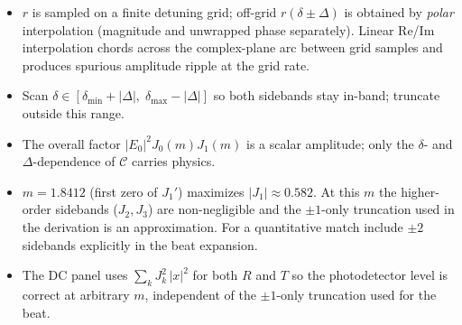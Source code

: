 \documentclass[aps,pra, onecolumn,superscriptaddress,nopacs,floatfix, showkeys, notitlepage]{revtex4-1}
\begin{document}
\begin{itemize}\setlength\itemsep{2pt}
  \item $r$ is sampled on a finite detuning grid; off-grid
        $r(\delta\pm\Delta)$ is obtained by \emph{polar} interpolation
        (magnitude and unwrapped phase separately). Linear Re/Im
        interpolation chords across the complex-plane arc between grid
        samples and produces spurious amplitude ripple at the grid rate.
  \item Scan $\delta \in [\delta_{\min} + |\Delta|,\; \delta_{\max} - |\Delta|]$
        so both sidebands stay in-band; truncate outside this range.
  \item The overall factor $|E_0|^2 J_0(m) J_1(m)$ is a scalar amplitude;
        only the $\delta$- and $\Delta$-dependence of $\mathcal{C}$ carries
        physics.
  \item $m = 1.8412$ (first zero of $J_1'$) maximizes $|J_1|\approx 0.582$.
        At this $m$ the higher-order sidebands ($J_2, J_3$) are
        non-negligible and the $\pm 1$-only truncation used in the derivation
        is an approximation. For a quantitative match include $\pm 2$
        sidebands explicitly in the beat expansion.
  \item The DC panel uses $\sum_k J_k^2\,|x|^2$ for both $R$ and $T$ so the
        photodetector level is correct at arbitrary $m$, independent of the
        $\pm 1$-only truncation used for the beat.
\end{itemize}
\end{document}
